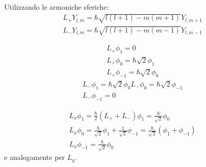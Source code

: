 Utilizzando le armoniche sferiche:
\begin{equation}\begin{split}
L_+Y_{l,m}=\hbar \sqrt{l\left(l+1\right)-m\left(m+1\right)}Y_{l,m+1}\\
L_-Y_{l,m}=\hbar \sqrt{l\left(l+1\right)-m\left(m-1\right)}Y_{l,m-1}
\end{split}\end{equation}

\begin{equation}\begin{split}
L_+\phi_1=0\\
L_+\phi_0=\hbar \sqrt{2}\phi_1\\
L_+\phi_{-1}=\hbar \sqrt{2}\phi_0
\end{split}\end{equation}
\begin{equation}\begin{split}
L_-\phi_1=\hbar \sqrt{2}\phi_0
L_-\phi_0=\hbar \sqrt{2}\phi_{-1}\\
L_-\phi_{-1}=0
\end{split}\end{equation}

\begin{equation}\begin{split}
L_x\phi_1=\frac{\hbar }{2}\left(L_++L_-\right)\phi_1=\frac{\hbar }{\sqrt{2}}\phi_0\\
L_x\phi_0=\frac{\hbar }{\sqrt{2}}\phi_1+\frac{1}{\sqrt{2}}\phi_{-1}=\frac{\hbar }{\sqrt{2}}\left(\phi_1+\phi_{-1}\right)\\
L_x\phi_{-1}=\frac{\hbar }{\sqrt{2}}\phi_0
\end{split}\end{equation}
e analogamente per $L_y$.

